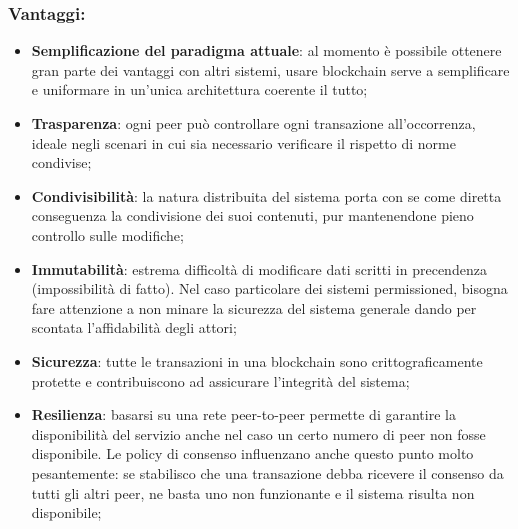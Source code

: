 		\subsubsection{Vantaggi:}
			\begin{itemize}
				\item \textbf{Semplificazione del paradigma attuale}: al momento è possibile ottenere gran parte dei vantaggi con altri sistemi, usare blockchain serve a semplificare e uniformare in un'unica architettura coerente il tutto;
				\item \textbf{Trasparenza}: ogni peer può controllare ogni transazione all'occorrenza, ideale negli scenari in cui sia necessario verificare il rispetto di norme condivise;
				\item \textbf{Condivisibilità}: la natura distribuita del sistema porta con se come diretta conseguenza la condivisione dei suoi contenuti, pur mantenendone pieno controllo sulle modifiche;
				\item \textbf{Immutabilità}: estrema difficoltà di modificare dati scritti in precendenza (impossibilità di fatto). Nel caso particolare dei sistemi permissioned, bisogna fare attenzione a non minare la sicurezza del sistema generale dando per scontata l'affidabilità degli attori;
				\item \textbf{Sicurezza}: tutte le transazioni in una blockchain sono crittograficamente protette e contribuiscono ad assicurare l'integrità del sistema;
				\item \textbf{Resilienza}: basarsi su una rete peer-to-peer permette di garantire la disponibilità del servizio anche nel caso un certo numero di peer non fosse disponibile. Le policy di consenso influenzano anche questo punto molto pesantemente: se stabilisco che una transazione debba ricevere il consenso da tutti gli altri peer, ne basta uno non funzionante e il sistema risulta non disponibile;
			\end{itemize}
